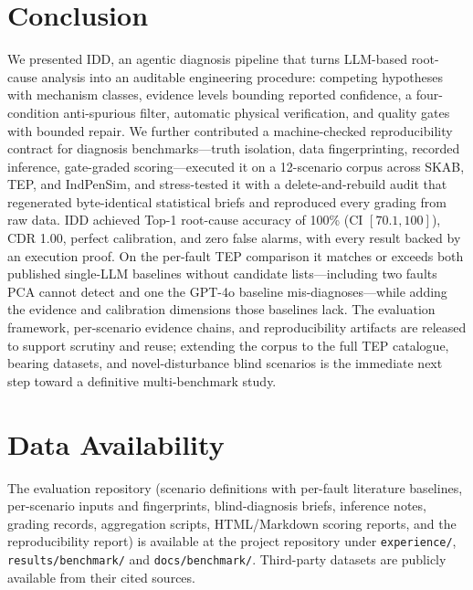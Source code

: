 \documentclass[journal]{IEEEtran}
\begin{document}
\section{Conclusion}
\label{sec:conclusion}

We presented IDD, an agentic diagnosis pipeline that turns LLM-based root-cause analysis into an auditable engineering procedure: competing hypotheses with mechanism classes, evidence levels bounding reported confidence, a four-condition anti-spurious filter, automatic physical verification, and quality gates with bounded repair. We further contributed a machine-checked reproducibility contract for diagnosis benchmarks---truth isolation, data fingerprinting, recorded inference, gate-graded scoring---executed it on a 12-scenario corpus across SKAB, TEP, and IndPenSim, and stress-tested it with a delete-and-rebuild audit that regenerated byte-identical statistical briefs and reproduced every grading from raw data. IDD achieved Top-1 root-cause accuracy of 100\% (CI $[70.1,100]$), CDR 1.00, perfect calibration, and zero false alarms, with every result backed by an execution proof. On the per-fault TEP comparison it matches or exceeds both published single-LLM baselines without candidate lists---including two faults PCA cannot detect and one the GPT-4o baseline mis-diagnoses---while adding the evidence and calibration dimensions those baselines lack. The evaluation framework, per-scenario evidence chains, and reproducibility artifacts are released to support scrutiny and reuse; extending the corpus to the full TEP catalogue, bearing datasets, and novel-disturbance blind scenarios is the immediate next step toward a definitive multi-benchmark study.

\section*{Data Availability}
The evaluation repository (scenario definitions with per-fault literature baselines, per-scenario inputs and fingerprints, blind-diagnosis briefs, inference notes, grading records, aggregation scripts, HTML/Markdown scoring reports, and the reproducibility report) is available at the project repository under \texttt{experience/}, \texttt{results/benchmark/} and \texttt{docs/benchmark/}. Third-party datasets are publicly available from their cited sources.



\end{document}
